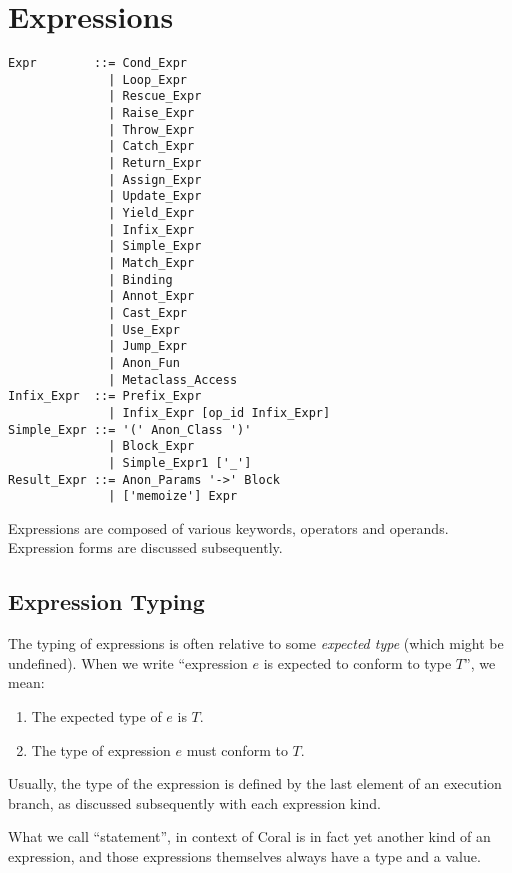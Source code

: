 
\chapter{Expressions}


\syntax\begin{lstlisting}
Expr        ::= Cond_Expr
              | Loop_Expr
              | Rescue_Expr
              | Raise_Expr
              | Throw_Expr
              | Catch_Expr
              | Return_Expr
              | Assign_Expr
              | Update_Expr
              | Yield_Expr
              | Infix_Expr
              | Simple_Expr
              | Match_Expr
              | Binding
              | Annot_Expr
              | Cast_Expr
              | Use_Expr
              | Jump_Expr
              | Anon_Fun
              | Metaclass_Access
Infix_Expr  ::= Prefix_Expr
              | Infix_Expr [op_id Infix_Expr]
Simple_Expr ::= '(' Anon_Class ')'
              | Block_Expr
              | Simple_Expr1 ['_']
Result_Expr ::= Anon_Params '->' Block 
              | ['memoize'] Expr
\end{lstlisting}

Expressions are composed of various keywords, operators and operands. Expression forms are discussed subsequently. 







\section{Expression Typing}

The typing of expressions is often relative to some {\em expected type} (which might be undefined). When we write ``expression $e$ is expected to conform to type $T$'', we mean:
\begin{enumerate}
\item The expected type of $e$ is $T$.
\item The type of expression $e$ must conform to $T$. 
\end{enumerate}

Usually, the type of the expression is defined by the last element of an execution branch, as discussed subsequently with each expression kind. 

What we call ``statement'', in context of Coral is in fact yet another kind of an expression, and those expressions themselves always have a type and a value. 





